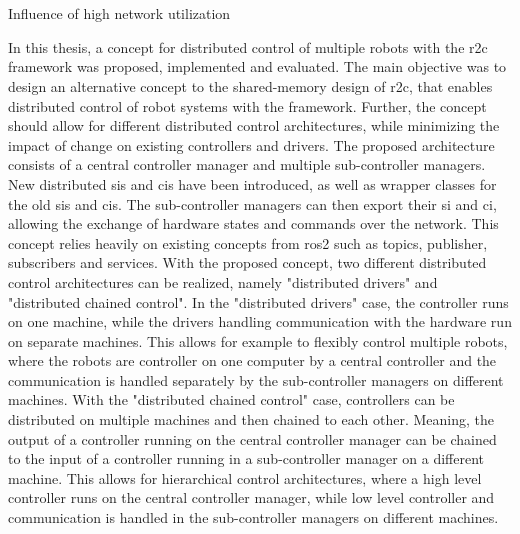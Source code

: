 \chapter{}
\label{sec:conclusion_and_outlook}
Influence of high network utilization

In  this thesis, a concept for distributed control of multiple robots with the \gls{r2c} framework was proposed, implemented and evaluated. The main objective was to design an alternative concept to the shared-memory design of \gls{r2c}, that enables distributed control of robot systems with the framework. Further, the concept should allow for different distributed control architectures, while minimizing the impact of change on existing controllers and drivers. \newline
The proposed architecture consists of a central controller manager and multiple sub-controller managers. New distributed \glspl{si} and \glspl{ci} have been introduced, as well as wrapper classes for the old \glspl{si} and \glspl{ci}. The sub-controller managers can then export their \gls{si} and \gls{ci}, allowing the exchange of hardware states and commands over the network. This concept relies heavily on existing concepts from \gls{ros2} such as topics, publisher, subscribers and services.\newline
With the proposed concept, two different distributed control architectures can be realized, namely "distributed drivers" and "distributed chained control". In the "distributed drivers" case, the controller runs on one machine, while the drivers handling communication with the hardware run on separate machines. This allows for example to flexibly control multiple robots, where the robots are controller on one computer by a central controller and the communication is handled separately by the sub-controller managers on different machines. With the "distributed chained control" case, controllers can be distributed on multiple machines and then chained to each other. Meaning, the output of a controller running on the central controller manager can be chained to the input of a controller running in a sub-controller manager on a different machine. This allows for hierarchical control architectures, where a high level controller runs on the central controller manager, while low level controller and communication is handled in the sub-controller managers on different machines.\newline
